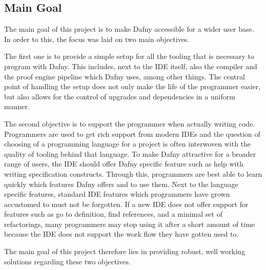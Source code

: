 \subsection{Main Goal}

The main goal of this project is to make Dafny accessible for a wider user base. In order to this, the focus was laid on two main objectives. \newline

The first one is to provide a simple setup for all the tooling that is necessary to program with Dafny. This includes, next to the IDE itself, also the compiler and the proof engine pipeline which Dafny uses, among other things. The central point of handling the setup does not only make the life of the programmer easier, but also allows for the control of upgrades and dependencies in a uniform manner. \newline

The second objective is to support the programmer when actually writing code. Programmers are used to get rich support from modern IDEs and the question of choosing of a programming language for a project is often interwoven with the quality of tooling behind that language. To make Dafny attractive for a broader range of users, the IDE should offer Dafny specific feature such as help with writing specification constructs. Through this, programmers are best able to learn quickly which features Dafny offers and to use them. Next to the language specific features, standard IDE features which programmers have grown accustomed to must not be forgotten. If a new IDE does not offer support for features such as go to definition, find references, and a minimal set of refactorings, many programmers may stop using it after a short amount of time because the IDE does not support the work flow they have gotten used to. \newline

The main goal of this project therefore lies in providing robust, well working solutions regarding these two objectives. \newline